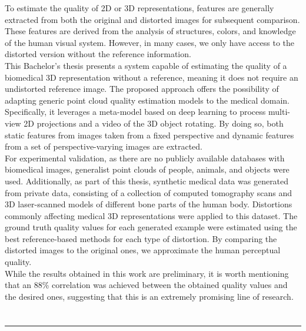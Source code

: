 To estimate the quality of 2D or 3D representations, features are generally extracted 
from both the original and distorted images for subsequent comparison. 
These features are derived from the analysis of structures, colors, and knowledge 
of the human visual system. However, in many cases, we only have access to the 
distorted version without the reference information.
\\

This Bachelor's thesis presents a system capable of estimating the quality of a 
biomedical 3D representation without a reference, meaning it does not require an 
undistorted reference image. The proposed approach offers the possibility of adapting 
generic point cloud quality estimation models to the medical domain. Specifically, 
it leverages a meta-model based on deep learning to process multi-view 2D projections 
and a video of the 3D object rotating. By doing so, both static features from images 
taken from a fixed perspective and dynamic features from a set of perspective-varying images are extracted.
\\

For experimental validation, as there are no publicly available databases with biomedical images, 
generalist point clouds of people, animals, and objects were used. 
Additionally, as part of this thesis, synthetic medical data was generated from private data, 
consisting of a collection of computed tomography scans and 3D laser-scanned models of 
different bone parts of the human body. Distortions commonly affecting medical 3D 
representations were applied to this dataset. The ground truth quality values for 
each generated example were estimated using the best reference-based methods for 
each type of distortion. By comparing the distorted images to the original ones, 
we approximate the human perceptual quality.
\\

While the results obtained in this work are preliminary, it is worth mentioning 
that an 88\% correlation was achieved between the obtained quality values and the 
desired ones, suggesting that this is an extremely promising line of research.

\chapter*{}
\thispagestyle{empty}

\noindent\rule[-1ex]{\textwidth}{2pt}\\[4.5ex]

